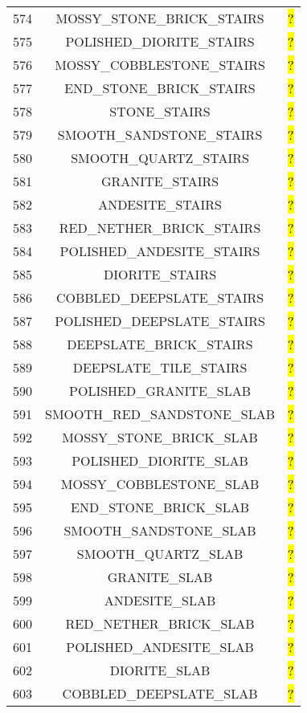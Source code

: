 \documentclass[11pt]{article}
\newcommand\myworries[1]{\sethlcolor{red}\hl{#1}}
\begin{document}
\begin{longtable}{ |c|c|c| }
574 & MOSSY\_STONE\_BRICK\_STAIRS & \myworries{?} \\
575 & POLISHED\_DIORITE\_STAIRS & \myworries{?} \\
576 & MOSSY\_COBBLESTONE\_STAIRS & \myworries{?} \\
577 & END\_STONE\_BRICK\_STAIRS & \myworries{?} \\
578 & STONE\_STAIRS & \myworries{?} \\
579 & SMOOTH\_SANDSTONE\_STAIRS & \myworries{?} \\
580 & SMOOTH\_QUARTZ\_STAIRS & \myworries{?} \\
581 & GRANITE\_STAIRS & \myworries{?} \\
582 & ANDESITE\_STAIRS & \myworries{?} \\
583 & RED\_NETHER\_BRICK\_STAIRS & \myworries{?} \\
584 & POLISHED\_ANDESITE\_STAIRS & \myworries{?} \\
585 & DIORITE\_STAIRS & \myworries{?} \\
586 & COBBLED\_DEEPSLATE\_STAIRS & \myworries{?} \\
587 & POLISHED\_DEEPSLATE\_STAIRS & \myworries{?} \\
588 & DEEPSLATE\_BRICK\_STAIRS & \myworries{?} \\
589 & DEEPSLATE\_TILE\_STAIRS & \myworries{?} \\
590 & POLISHED\_GRANITE\_SLAB & \myworries{?} \\
591 & SMOOTH\_RED\_SANDSTONE\_SLAB & \myworries{?} \\
592 & MOSSY\_STONE\_BRICK\_SLAB & \myworries{?} \\
593 & POLISHED\_DIORITE\_SLAB & \myworries{?} \\
594 & MOSSY\_COBBLESTONE\_SLAB & \myworries{?} \\
595 & END\_STONE\_BRICK\_SLAB & \myworries{?} \\
596 & SMOOTH\_SANDSTONE\_SLAB & \myworries{?} \\
597 & SMOOTH\_QUARTZ\_SLAB & \myworries{?} \\
598 & GRANITE\_SLAB & \myworries{?} \\
599 & ANDESITE\_SLAB & \myworries{?} \\
600 & RED\_NETHER\_BRICK\_SLAB & \myworries{?} \\
601 & POLISHED\_ANDESITE\_SLAB & \myworries{?} \\
602 & DIORITE\_SLAB & \myworries{?} \\
603 & COBBLED\_DEEPSLATE\_SLAB & \myworries{?} \\

\end{longtable}
\end{document}
